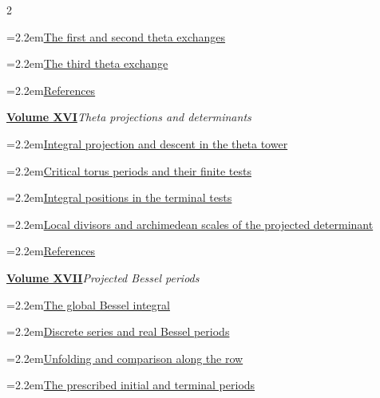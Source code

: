 \documentclass[a4paper,11pt]{article}
\theoremstyle{definition}
\theoremstyle{remark}
\numberwithin{equation}{section}
\begin{document}
\begin{multicols}{2}
\begin{minipage}{\linewidth}
\noindent\hangindent=2.2em\hyperref[nav:first-second-exchange]{The first and second theta exchanges}\par
\noindent\hangindent=2.2em\hyperref[nav:third-exchange]{The third theta exchange}\par
\noindent\hangindent=2.2em\hyperref[nav:bibliography-XV]{References}\par
\end{minipage}\par\medskip
\noindent\begin{minipage}{\linewidth}\raggedright
\textbf{\hyperref[nav:volume-XVI]{Volume XVI}}\enspace\emph{Theta projections and determinants}\par\smallskip
\noindent\hangindent=2.2em\hyperref[nav:theta-descent]{Integral projection and descent in the theta tower}\par
\noindent\hangindent=2.2em\hyperref[nav:critical-torus-tests]{Critical torus periods and their finite tests}\par
\noindent\hangindent=2.2em\hyperref[nav:g-VIII-4]{Integral positions in the terminal tests}\par
\noindent\hangindent=2.2em\hyperref[nav:terminal-determinants]{Local divisors and archimedean scales of the projected determinant}\par
\noindent\hangindent=2.2em\hyperref[nav:bibliography-XVI]{References}\par
\end{minipage}\par\medskip
\noindent\begin{minipage}{\linewidth}\raggedright
\textbf{\hyperref[nav:volume-XVII]{Volume XVII}}\enspace\emph{Projected Bessel periods}\par\smallskip
\noindent\hangindent=2.2em\hyperref[nav:g-VII-0]{The global Bessel integral}\par
\noindent\hangindent=2.2em\hyperref[nav:g-VII-1]{Discrete series and real Bessel periods}\par
\noindent\hangindent=2.2em\hyperref[nav:g-VII-2]{Unfolding and comparison along the row}\par
\noindent\hangindent=2.2em\hyperref[nav:g-VII-3]{The prescribed initial and terminal periods}\par

\end{minipage}
\end{multicols}
\end{document}
